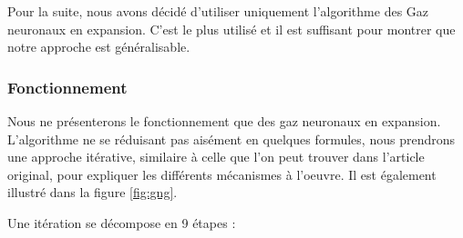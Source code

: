 	Pour la suite, nous avons décidé d'utiliser uniquement l'algorithme des Gaz neuronaux en expansion. C'est le plus utilisé et il est suffisant pour montrer que notre approche est généralisable.

	\subsubsection{Fonctionnement}

	Nous ne présenterons le fonctionnement que des gaz neuronaux en expansion. L'algorithme ne se réduisant pas aisément en quelques formules, nous prendrons une approche itérative, similaire à celle que l'on peut trouver dans l'article original, pour expliquer les différents mécanismes à l'oeuvre. Il est également illustré dans la figure \ref{fig:gng}.

	Une itération se décompose en 9 étapes :
